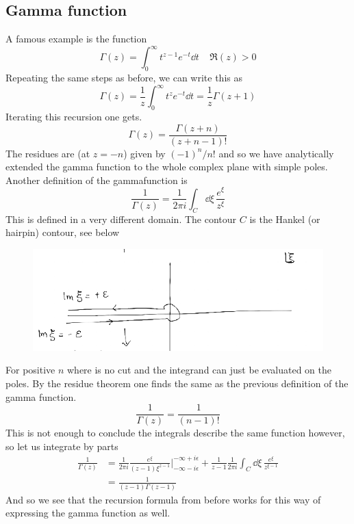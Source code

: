 \documentclass[a4paper,12pt]{article}
\begin{document}
\subsection{Gamma function}
A famous example is the function
\begin{equation}
\Gamma(z)=\int_0^{\infty}t^{z-1}e^{-t}\dd t~~~~~\Re(z)>0
\end{equation}
Repeating the same steps as before, we can write this as
\begin{equation}
	\Gamma(z)= \frac{1}{z}\int_0^{\infty}t^{z}e^{-t}\dd t=\frac{1}{z}\Gamma(z+1)
\end{equation}
Iterating this recursion one gets.
\begin{equation}
\Gamma(z)=\frac{\Gamma(z+n)}{(z+n-1)!}
\end{equation}
The residues are (at $z=-n$) given by $(-1)^n/n!$ and so we have analytically extended the gamma function to the whole complex plane with simple poles. Another definition of the gammafunction is
\begin{equation}
\frac{1}{\Gamma(z)}=\frac{1}{2\pi i}\int_C \dd \xi\, \frac{e^\xi}{z^\xi}
\end{equation}
This is defined in a very different domain. The contour $C$ is the Hankel (or hairpin) contour, see below
\begin{figure}[H]
	\centering
	\includegraphics[width=0.7\linewidth]{20}
	\caption{}
	\label{fig:4}
\end{figure}
For positive $n$ where is no cut and the integrand can just be evaluated on the poles. By the residue theorem one finds the same as the previous definition of the gamma function.
\begin{equation}
	\frac{1}{\Gamma(z)}=\frac{1}{(n-1)!}
\end{equation}
 This is not enough to conclude the integrals describe the same function however, so let us integrate by parts
\begin{equation}
\begin{aligned}
	\frac{1}{\Gamma(z)}&=\frac{1}{2\pi i}\frac{e^{\xi}}{(z-1)\xi^{z-1}}\Big|_{-\infty-i\epsilon}^{-\infty+i\epsilon}
+
\frac{1}{z-1}\frac{1}{2\pi i}\int_C \dd \xi\, \frac{e^\xi}{z^{\xi-1}}\\
&=\frac{1}{(z-1)\Gamma(z-1)}
\end{aligned}
\end{equation}
And so we see that the recursion formula from before works for this way of expressing the gamma function as well.
\end{document}
